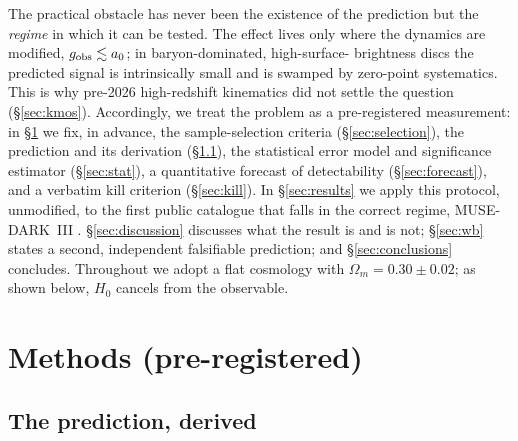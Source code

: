 \documentclass[fleqn,usenatbib]{mnras}
\newcommand{\azero}{a_0}
\begin{document}
The practical obstacle has never been the existence of the prediction but the
\emph{regime} in which it can be tested. The effect lives only where the dynamics
are modified, $g_{\rm obs}\lesssim\azero$; in baryon-dominated, high-surface-
brightness discs the predicted signal is intrinsically small and is swamped by
zero-point systematics. This is why pre-2026 high-redshift kinematics did not settle
the question (\S\ref{sec:kmos}). Accordingly, we treat the problem as a
pre-registered measurement: in \S\ref{sec:methods} we fix, in advance, the
sample-selection criteria (\S\ref{sec:selection}), the prediction and its derivation
(\S\ref{sec:prediction}), the statistical error model and significance estimator
(\S\ref{sec:stat}), a quantitative forecast of detectability
(\S\ref{sec:forecast}), and a verbatim kill criterion (\S\ref{sec:kill}). In
\S\ref{sec:results} we apply this protocol, unmodified, to the first public
catalogue that falls in the correct regime, MUSE-DARK~III \citep{Ciocan2026}.
\S\ref{sec:discussion} discusses what the result is and is not;
\S\ref{sec:wb} states a second, independent falsifiable prediction; and
\S\ref{sec:conclusions} concludes. Throughout we adopt a flat cosmology with
$\Omega_m=0.30\pm0.02$; as shown below, $H_0$ cancels from the observable.

\section{Methods (pre-registered)}\label{sec:methods}

\subsection{The prediction, derived}\label{sec:prediction}
\end{document}

